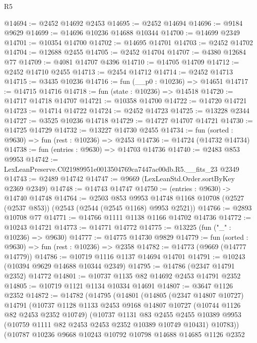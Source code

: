 \begin{lexlean}{R5}
\begin{coremodule}
@14694 := @2452 @14692 @2453
@14695 := @2452 @14694
@14696 := @9184 @9629
@14699 := @14696 @10236 @14688 @10344
@14700 := @14699 @2349
@14701 := @10354 @14700
@14702 := @14695 @14701
@14703 := @2452 @14702
@14704 := @12688 @2455
@14705 := @2452 @14704
@14707 := @4380 @12684 @77
@14709 := @4081 @14707 @4396
@14710 := @14705 @14709
@14712 := @2452 @14710 @2455
@14713 := @2454 @14712
@14714 := @2452 @14713
@14715 := @3435 @10236
@14716 := fun (__p0 : @10236) => @14651
@14717 := @14715 @14716
@14718 := fun (state : @10236) => @14518
@14720 := @14717 @14718 @14707
@14721 := @10358 @14700
@14722 := @14720 @14721
@14723 := @14714 @14722
@14724 := @2452 @14723
@14725 := @13228 @2344
@14727 := @3525 @10236 @14718
@14729 := @14727 @14707 @14721
@14730 := @14725 @14729
@14732 := @13227 @14730 @2455
@14734 := fun (sorted : @9630) => fun (rest : @10236) => @2453
@14736 := @14724 (@14732 @14734)
@14738 := fun (entries : @9630) => @14703 @14736
@14740 := @2483 @853 @9953
@14742 := LexLeanPreserve.C021989951e0013504769ca7447ac00db.R5.__fits_23 @2349
@14743 := @2489 @14742
@14747 := @9669 (LexLeanStd.Order.sortByKey @2369 @2349)
@14748 := @14743 @14747
@14750 := (entries : @9630) -> @14740 @14748
@14764 := @2503
    @853
    @9953
    @14748
    @1168
    @10708
    (@2527 (@2537 @853))
    (@2543 (@2544 (@2545 @1168) @9953 @2521))
@14766 := @2893 @10708 @77
@14771 := @14766 @1111 @1138 @1166 @14702 @14736
@14772 := @10243 @14721
@14773 := @14771 @14772
@14775 := @13225 (fun ("_" : @10236) => @9630)
@14777 := @14775 @14730 @9829
@14779 := fun (sorted : @9630) => fun (rest : @10236) => @2358
@14782 := @14773 (@9669 (@14777 @14779))
@14786 := @10719 @1116 @1137 @14694 @14701
@14791 := @10243 (@10394 @9629 @14688 @10344 @2349)
@14795 := @14786 (@2347 @14791 @2352) @14772
@14801 := @10737 @1135 @82 @14692 @2453 @14791 @2352
@14805 := @10719 @1121 @1134 @10334 @14691
@14807 := @3647 @1126 @2352
@14872 := @14782
    (@14795
      (@14801
        (@14805
          (@2347 @14807 @10727)
          @14791
          (@10737
            @1128
            @1133
            @2453
            @9168
            @14807
            @10727
            (@10744 @1126 @82 @2453 @2352 @10749)
            (@10737
              @1131
              @83
              @2455
              @2455
              @10389
              @9953
              (@10759 @1111 @82 @2453 @2453 @2352 @10389 @10749 @10431)
              @10783))
          (@10787
            @10236
            @9668
            @10243
            @10792
            @10798
            @14688
            @14685
            @1126
            @2352

\end{coremodule}
\end{lexlean}
